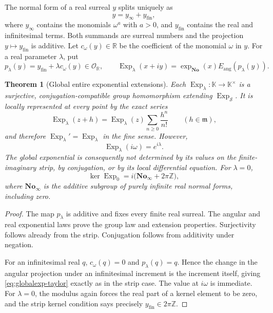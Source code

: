 \documentclass[11pt,letterpaper]{article}
\numberwithin{equation}{section}
\newtheorem{theorem}{Theorem}[section]
\theoremstyle{definition}
\theoremstyle{remark}
\newcommand{\No}{\mathbf{No}}
\newcommand{\K}{\mathbb{K}}
\newcommand{\R}{\mathbb{R}}
\newcommand{\Z}{\mathbb{Z}}
\newcommand{\OO}{\mathcal{O}}
\newcommand{\mm}{\mathfrak{m}}
\newcommand{\fin}{\operatorname{fin}}
\newcommand{\Exp}{\operatorname{Exp}}
\begin{document}
The normal form of a real surreal $y$ splits uniquely as
\[
 y=y_\infty+y_{\fin},
\]
where $y_\infty$ contains the monomials $\omega^a$ with $a>0$, and
$y_{\fin}$ contains the real and infinitesimal terms. Both summands are
surreal numbers and the projection $y\mapsto y_{\fin}$ is additive.
Let $c_\omega(y)\in\R$ be the coefficient of the monomial $\omega$ in $y$.
For a real parameter $\lambda$, put
\begin{equation}\label{eq:phaseprojection}
 p_\lambda(y)=y_{\fin}+\lambda c_\omega(y)\in\OO_\R,
 \qquad
 \Exp_\lambda(x+iy)=\exp_{\No}(x)E_{\mathrm{ang}}(p_\lambda(y)).
\end{equation}

\begin{theorem}[Global entire exponential extensions]\label{thm:globalexp}
Each $\Exp_\lambda:\K\to\K^\times$ is a surjective, conjugation-compatible
group homomorphism extending $\Exp_{\mathcal S}$. It is locally represented
at every point by the exact series
\begin{equation}\label{eq:globalexp-taylor}
 \Exp_\lambda(z+h)=\Exp_\lambda(z)
          \sum_{n\ge0}\frac{h^n}{n!}\qquad(h\in\mm),
\end{equation}
and therefore $\Exp_\lambda'=\Exp_\lambda$ in the fine sense. However,
\[
 \Exp_\lambda(i\omega)=e^{i\lambda}.
\]
The global exponential is consequently not determined by its values on the
finite-imaginary strip, by conjugation, or by its local differential equation.
For $\lambda=0$,
\begin{equation}\label{eq:global-kernel}
 \ker\Exp_0=i\bigl(\No_\infty+2\pi\Z\bigr),
\end{equation}
where $\No_\infty$ is the additive subgroup of purely infinite real normal
forms, including zero.
\end{theorem}
\begin{proof}
The map $p_\lambda$ is additive and fixes every finite real surreal. The
angular and real exponential laws prove the group law and extension
properties. Surjectivity follows already from the strip. Conjugation follows
from additivity under negation.

For an infinitesimal real $q$, $c_\omega(q)=0$ and $p_\lambda(q)=q$.
Hence the change in the angular projection under an infinitesimal increment
is the increment itself, giving \eqref{eq:globalexp-taylor} exactly as in the
strip case. The value at $i\omega$ is immediate. For $\lambda=0$, the
modulus again forces the real part of a kernel element to be zero, and the
strip kernel condition says precisely $y_{\fin}\in2\pi\Z$.
\end{proof}
\end{document}

